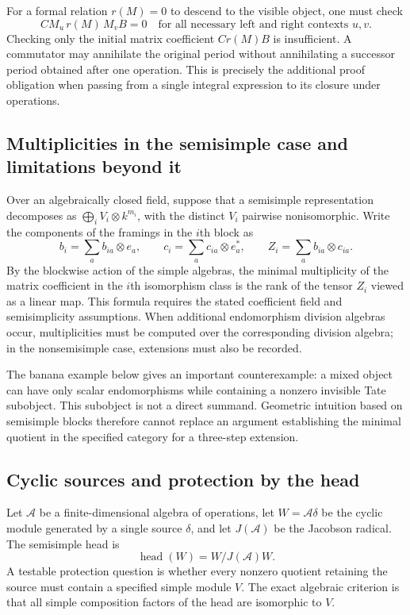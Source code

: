 \documentclass[11pt,a4paper,oneside]{article}
\theoremstyle{plain}
\theoremstyle{definition}
\theoremstyle{remark}
\numberwithin{equation}{section}
\begin{document}
For a formal relation $r(M)=0$ to descend to the visible object, one must check
\begin{equation}
 CM_u\,r(M)\,M_vB=0
 \quad\text{for all necessary left and right contexts }u,v.
\end{equation}
Checking only the initial matrix coefficient $Cr(M)B$ is insufficient. A commutator may annihilate the original period without annihilating a successor period obtained after one operation. This is precisely the additional proof obligation when passing from a single integral expression to its closure under operations.


\subsection{Multiplicities in the semisimple case and limitations beyond it}
Over an algebraically closed field, suppose that a semisimple representation decomposes as $\bigoplus_i V_i\otimes k^{m_i}$, with the distinct $V_i$ pairwise nonisomorphic. Write the components of the framings in the $i$th block as
\begin{equation}
 b_i=\sum_a b_{ia}\otimes e_a,\qquad
 c_i=\sum_a c_{ia}\otimes e_a^*,\qquad
 Z_i=\sum_a b_{ia}\otimes c_{ia}.
\end{equation}
By the blockwise action of the simple algebras, the minimal multiplicity of the matrix coefficient in the $i$th isomorphism class is the rank of the tensor $Z_i$ viewed as a linear map. This formula requires the stated coefficient field and semisimplicity assumptions. When additional endomorphism division algebras occur, multiplicities must be computed over the corresponding division algebra; in the nonsemisimple case, extensions must also be recorded.

The banana example below gives an important counterexample: a mixed object can have only scalar endomorphisms while containing a nonzero invisible Tate subobject. This subobject is not a direct summand. Geometric intuition based on semisimple blocks therefore cannot replace an argument establishing the minimal quotient in the specified category for a three-step extension.


\subsection{Cyclic sources and protection by the head}
Let $\mathcal A$ be a finite-dimensional algebra of operations, let $W=\mathcal A\delta$ be the cyclic module generated by a single source $\delta$, and let $J(\mathcal A)$ be the Jacobson radical. The semisimple head is
\begin{equation}
 \operatorname{head}(W)=W/J(\mathcal A)W.
\end{equation}
A testable protection question is whether every nonzero quotient retaining the source must contain a specified simple module $V$. The exact algebraic criterion is that all simple composition factors of the head are isomorphic to $V$.
\end{document}
